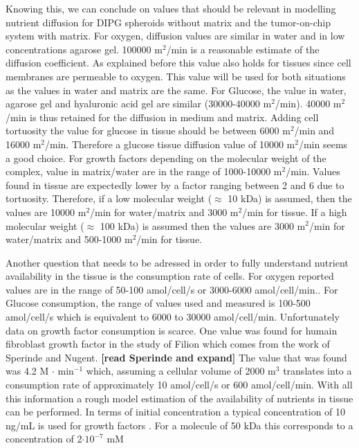 \documentclass[11pt,a4paper]{article}
\begin{document}
Knowing this, we can conclude on values that should be relevant in modelling nutrient diffusion for DIPG spheroids without matrix and the tumor-on-chip system with matrix. For oxygen, diffusion values are similar in water and in low concentrations agarose gel. 100000 \textmu m$^2$/min is a reasonable estimate of the diffusion coefficient. As explained before this value also holds for tissues since cell membranes are permeable to oxygen. This value will be used for both situations as the values in water and matrix are the same. For Glucose, the value in water, agarose gel and hyaluronic acid gel are similar (30000-40000 \textmu m$^2$/min). 40000 \textmu m$^2$/min is thus retained for the diffusion in medium and matrix. Adding cell tortuosity the value for glucose in tissue should be between 6000 \textmu m$^2$/min and 16000 \textmu m$^2$/min. Therefore a glucose tissue diffusion value  of 10000 \textmu m$^2$/min seems a good choice. For growth factors depending on the molecular weight of the complex, value in matrix/water are in the range of 1000-10000 \textmu m$^2$/min. Values found in tissue are expectedly lower by a factor ranging between 2 and 6 due to tortuosity. Therefore, if a low molecular weight ($\approx$ 10 kDa) is assumed, then the values are 10000 \textmu m$^2$/min for water/matrix and 3000 \textmu m$^2$/min for tissue. If a high molecular weight ($\approx$ 100 kDa)  is assumed then the values are 3000 \textmu m$^2$/min for water/matrix and 500-1000 \textmu m$^2$/min for tissue.

Another question that needs to be adressed in order to fully understand nutrient availability in the tissue is the consumption rate of cells. For oxygen reported values are in the range of 50-100 amol/cell/s or 3000-6000 amol/cell/min.\cite{Nelson2017}\cite{Kempf2005}\cite{Mao2018}. For Glucose consumption, the range of values used and measured is 100-500 amol/cell/s which is equivalent to 6000 to 30000 amol/cell/min\cite{Mao2018}\cite{Kempf2005}\cite{Cleri2019}\cite{Jagiella2016}. Unfortunately data on growth factor consumption is scarce. One value was found for humain fibroblast growth factor in the study of Filion which comes from the work of Sperinde and Nugent.\cite{Filion2004}\cite{Sperinde2000} \textbf{[read Sperinde and expand]} The value that was found was 4.2 \textmu M $\cdot$ min$^{-1}$ which, assuming a cellular volume of 2000 \textmu m$^3$ translates into a consumption rate of approximately 10 amol/cell/s or 600 amol/cell/min. With all this information a rough model estimation of the availability of nutrients in tissue can be performed. In terms of initial concentration a typical concentration of 10 ng/mL is used for growth factors \cite{Meel2018}. For a molecule of 50 kDa this corresponds to a concentration of 2$\cdot 10^{-7}$ mM
\end{document}

